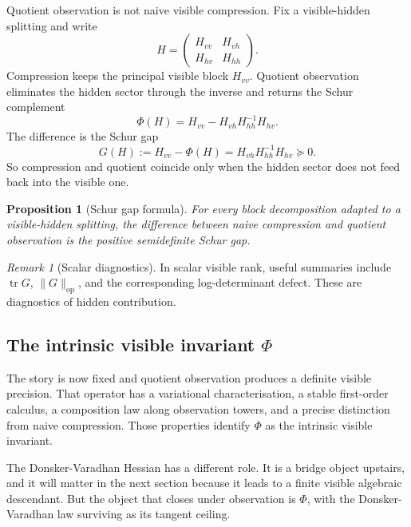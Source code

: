\documentclass[11pt]{article}
\numberwithin{equation}{section}
\theoremstyle{thmcompact}
\newtheorem{proposition}[theorem]{Proposition}
\theoremstyle{remark}
\newtheorem*{remarkplain}{Remark}
\newenvironment{remark}[1][]%
{\begin{remarkbox}\begin{remarkplain}[#1]\normalfont}
		{\end{remarkplain}\end{remarkbox}}
\begin{document}
Quotient observation is not naive visible compression. Fix a visible-hidden splitting and write
\begin{equation}
H
=
\begin{pmatrix}
H_{vv} & H_{vh} \\
H_{hv} & H_{hh}
\end{pmatrix}.
\end{equation}
Compression keeps the principal visible block $H_{vv}$. Quotient observation eliminates the hidden sector through the inverse and returns the Schur complement \cite{Zhang2005,Haynsworth1968,CarlsonHaynsworthMarkham1974}
\begin{equation}
\Phi(H)=H_{vv}-H_{vh}H_{hh}^{-1}H_{hv}.
\label{eq:schur-complement}
\end{equation}
The difference is the Schur gap
\begin{equation}
G(H)
:=
H_{vv}-\Phi(H)
=
H_{vh}H_{hh}^{-1}H_{hv}
\succeq 0.
\label{eq:schur-gap}
\end{equation}
So compression and quotient coincide only when the hidden sector does not feed back into the visible one.

\begin{proposition}[Schur gap formula]
For every block decomposition adapted to a visible-hidden splitting, the difference between naive compression and quotient observation is the positive semidefinite Schur gap.
\end{proposition}

\begin{remark}[Scalar diagnostics]
In scalar visible rank, useful summaries include $\operatorname{tr} G$, $\|G\|_{\mathrm{op}}$, and the corresponding log-determinant defect. These are diagnostics of hidden contribution.
\end{remark}

\subsection{The intrinsic visible invariant \texorpdfstring{$\Phi$}{Phi}}

The story is now fixed and quotient observation produces a definite visible precision. That operator has a variational characterisation, a stable first-order calculus, a composition law along observation towers, and a precise distinction from naive compression. Those properties identify $\Phi$ as the intrinsic visible invariant.

The Donsker-Varadhan Hessian has a different role. It is a bridge object upstairs, and it will matter in the next section because it leads to a finite visible algebraic descendant. But the object that closes under observation is $\Phi$, with the Donsker-Varadhan law surviving as its tangent ceiling.
\end{document}
